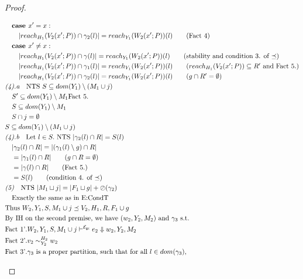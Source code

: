 \documentclass[11pt]{article}
\newcommand{\ms}[1]{\ensuremath{\mathsf{#1}}}
\newcommand{\veq}[4]{#3 \sim^{#1}_{#2} #4}
\newcommand{\oh}[1]{\oslash(#1)}
\newcommand{\gcSem}{\ensuremath{\mathcal{E}_{\ms{gc}}}}
\theoremstyle{definition}
\begin{document}
\begin{proof}
\begin{description}
\begin{align*}
		&\quad \textbf{case } x' = x:\\
		&\quad\quad |reach_{H_1}(V_2(x';P)) \cap \gamma_2(l)| = reach_{Y_1}(W_2(x';P))(l) \tag{Fact 4}\\ 
		&\quad \textbf{case } x' \ne x:\\
		&\quad\quad |reach_{H_1}(V_2(x';P)) \cap \gamma(l)| = reach_{Y_1}(W_2(x';P))(l) 
			\tag{stability and condition 3. of $\preceq$}\\ 
		&\quad\quad |reach_{H_1}(V_2(x';P)) \cap \gamma_1(l)| = reach_{Y_1}(W_2(x';P))(l) 
			\tag{$reach_{H_1}(V_2(x';P)) \subseteq R'$ and Fact 5.}\\
		&\quad\quad |reach_{H_1}(V_2(x';P)) \cap \gamma_2(l)| = reach_{Y_1}(W_2(x';P))(l) 
			\tag{$g \cap R' = \emptyset$}\\
		&\emph{(4).a}\quad \text{NTS } S \subseteq dom(Y_1) \setminus (M_1 \cup j)\\
		&\quad S' \subseteq dom(Y_1) \setminus M_1 \text{Fact 5.}\\
		&\quad S \subseteq dom(Y_1) \setminus M_1\\
		&\quad S \cap j = \emptyset\\
		&S \subseteq dom(Y_1) \setminus (M_1 \cup j)\\
		&\emph{(4).b}\quad \text{Let } l \in S. \text{ NTS } |\gamma_2(l) \cap R| = S(l)\\
		&\quad |\gamma_2(l) \cap R| = |(\gamma_1(l) \setminus g) \cap R| \\
		&\quad = |\gamma_1(l) \cap R| \tag{$g \cap R = \emptyset$}\\
		&\quad = |\gamma(l) \cap R| \tag{Fact 5.}\\
		&\quad = S(l) \tag{condition 4. of $\preceq$}\\ 
		&\emph{(5)}\quad \text{NTS } |M_1 \sqcup j| = |F_1 \sqcup g| + \oh{\gamma_2}\\
		&\quad\text{Exactly the same as in E:CondT}\\
		&\text{Thus } W_2,Y_1,S,M_1 \cup j \preceq V_2,H_1,R, F_1 \cup g\\
		&\text{By IH on the second premise, we have } (w_2,Y_2,M_2) \text{ and } \gamma_3 \text{ s.t. }\\
		&\text{Fact 1'}. W_2,Y_1,S,M_1 \cup j \vdash^{\gcSem} e_2 \Downarrow w_2,Y_2,M_2\\
		&\text{Fact 2'}. \veq{H_2}{Y_2}{v_2}{w_2}\\
		&\text{Fact 3'}. \gamma_3 \text{ is a proper partition, such that for all } l \in dom(\gamma_3),\\

\end{align*}
\end{description}
\end{proof}
\end{document}
